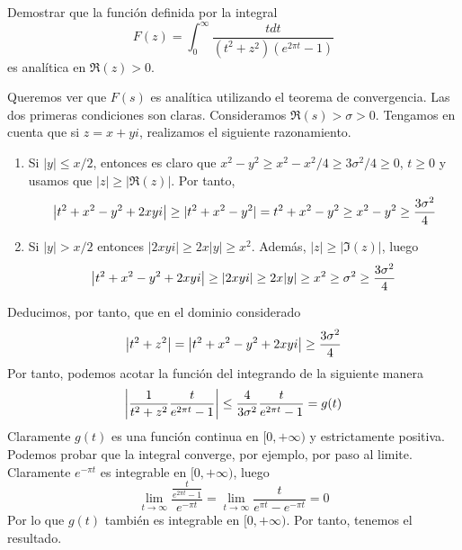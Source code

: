 \documentclass[twoside]{article}
\begin{document}
\begin{ejercicio}{2}
Demostrar que la función definida por la integral 
$$
F(z)=\int_0^\infty\frac{tdt}{(t^2+z^2)(e^{2\pi t}-1)}
$$
es analítica en $\Re(z) >0$.
\end{ejercicio}
\begin{solucion}
Queremos ver que $F(s)$ es analítica utilizando el teorema de convergencia. Las dos primeras condiciones son claras. Consideramos $\Re(s)>\sigma >0$. Tengamos en cuenta que si $z=x+yi$, realizamos el siguiente razonamiento.
\begin{enumerate}
\item Si $|y|\leq x/2$, entonces es claro que $x^2-y^2 \geq x^2-x^2/4 \geq 3\sigma^2/4\geq 0$, $t\geq 0$ y usamos que $|z|\geq |\Re(z)|$. Por tanto,
$$
\left\lvert t^2+x^2-y^2+2xyi\right\rvert \geq |t^2+x^2-y^2| = t^2 + x^2-y^2 \geq x^2-y^2 \geq \frac{3\sigma^2}{4}
$$
\item Si $|y|>x/2$ entonces $|2xyi|\geq 2x|y| \geq x^2$. Además, $|z|\geq |\Im(z)|$, luego
$$
\left\lvert t^2+x^2-y^2+2xyi\right\rvert \geq |2xyi|\geq 2x|y| \geq x^2 \geq \sigma^2 \geq \frac{3\sigma^2}{4}
$$
\end{enumerate}
Deducimos, por tanto, que en el dominio considerado
$$
\left\lvert t^2+z^2\right\rvert = \left\lvert t^2+x^2-y^2+2xyi\right\rvert \geq \frac{3\sigma^2}{4} 
$$
Por tanto, podemos acotar la función del integrando de la siguiente manera
\begin{align*}
\left\lvert\frac{1}{t^2+z^2}\frac{t}{e^{2\pi t}-1}\right\rvert \leq \frac{4}{3\sigma^2}\frac{t}{e^{2\pi t}-1}= g(t)
\end{align*}
Claramente $g(t)$ es una función continua en $[0,+\infty)$ y estrictamente positiva. Podemos probar que la integral converge, por ejemplo, por paso al limite. Claramente $e^{-\pi t}$ es integrable en $[0,+\infty)$, luego
$$
\lim_{t\to \infty}\frac{\frac{t}{e^{2\pi t}-1}}{e^{-\pi t}} = \lim_{t\to \infty}\frac{t}{e^{\pi t}-e^{-\pi t}} = 0
$$
Por lo que $g(t)$ también es integrable en $[0,+\infty)$. Por tanto, tenemos el resultado.
\end{solucion}
\newpage
\end{document}
